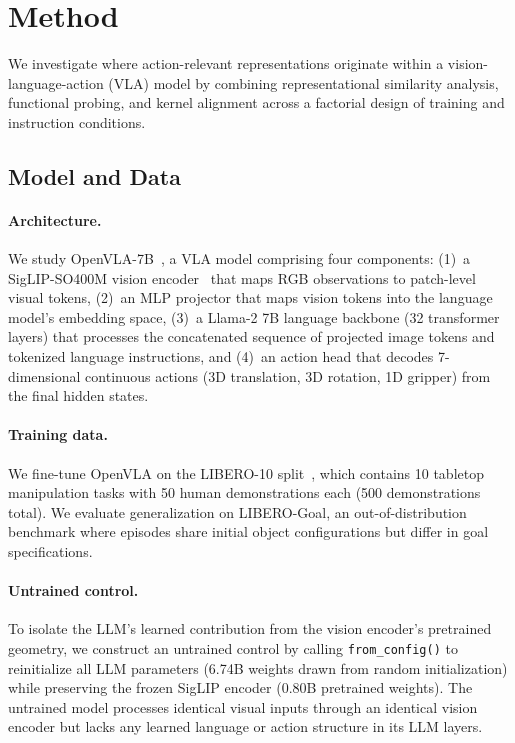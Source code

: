 \section{Method}
\label{sec:method}

We investigate where action-relevant representations originate within a vision-language-action (VLA) model by combining representational similarity analysis, functional probing, and kernel alignment across a factorial design of training and instruction conditions.

\subsection{Model and Data}
\label{sec:model_data}

\paragraph{Architecture.}
We study OpenVLA-7B~\cite{kim2024_openvla,karamcheti2024}, a VLA model comprising four components: (1)~a SigLIP-SO400M vision encoder~\cite{zhai2023_siglip} that maps RGB observations to patch-level visual tokens, (2)~an MLP projector that maps vision tokens into the language model's embedding space, (3)~a Llama-2 7B language backbone (32 transformer layers) that processes the concatenated sequence of projected image tokens and tokenized language instructions, and (4)~an action head that decodes 7-dimensional continuous actions (3D translation, 3D rotation, 1D gripper) from the final hidden states.

\paragraph{Training data.}
We fine-tune OpenVLA on the LIBERO-10 split~\cite{liu2023_libero}, which contains 10 tabletop manipulation tasks with 50 human demonstrations each (500 demonstrations total).
We evaluate generalization on LIBERO-Goal, an out-of-distribution benchmark where episodes share initial object configurations but differ in goal specifications.

\paragraph{Untrained control.}
To isolate the LLM's learned contribution from the vision encoder's pretrained geometry, we construct an untrained control by calling \texttt{from\_config()} to reinitialize all LLM parameters (6.74B weights drawn from random initialization) while preserving the frozen SigLIP encoder (0.80B pretrained weights).
The untrained model processes identical visual inputs through an identical vision encoder but lacks any learned language or action structure in its LLM layers.

